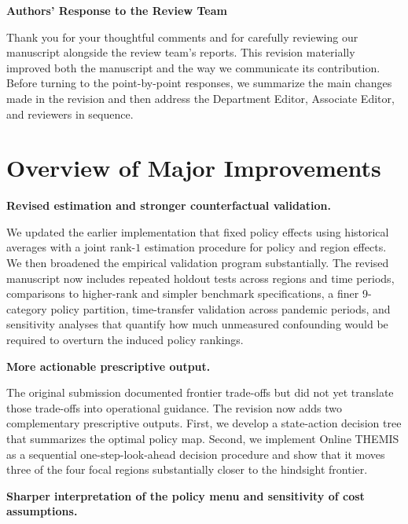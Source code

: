 \documentclass[letterpaper,twoside,11pt]{reviewresponse}
\begin{document}

\begin{center}
{\large {\bf Authors' Response to the Review Team}}
\end{center}

Thank you for your thoughtful comments and for carefully reviewing our manuscript alongside the review team’s reports. This revision materially improved both the manuscript and the way we communicate its contribution. Before turning to the point-by-point responses, we summarize the main changes made in the revision and then address the Department Editor, Associate Editor, and reviewers in sequence.

\setcounter{tocdepth}{1}
\tableofcontents

\newpage

\section*{Overview of Major Improvements}
\label{sec:overview}

\noindent\textbf{Revised estimation and stronger counterfactual validation.}

We updated the earlier implementation that fixed policy effects using historical averages with a joint rank-$1$ estimation procedure for policy and region effects. We then broadened the empirical validation program substantially. The revised manuscript now includes repeated holdout tests across regions and time periods, comparisons to higher-rank and simpler benchmark specifications, a finer 9-category policy partition, time-transfer validation across pandemic periods, and sensitivity analyses that quantify how much unmeasured confounding would be required to overturn the induced policy rankings.

\noindent\textbf{More actionable prescriptive output.}

The original submission documented frontier trade-offs but did not yet translate those trade-offs into operational guidance. The revision now adds two complementary prescriptive outputs. First, we develop a state-action decision tree that summarizes the optimal policy map. Second, we implement Online THEMIS as a sequential one-step-look-ahead decision procedure and show that it moves three of the four focal regions substantially closer to the hindsight frontier.

\noindent\textbf{Sharper interpretation of the policy menu and sensitivity of cost assumptions.}
\end{document}
